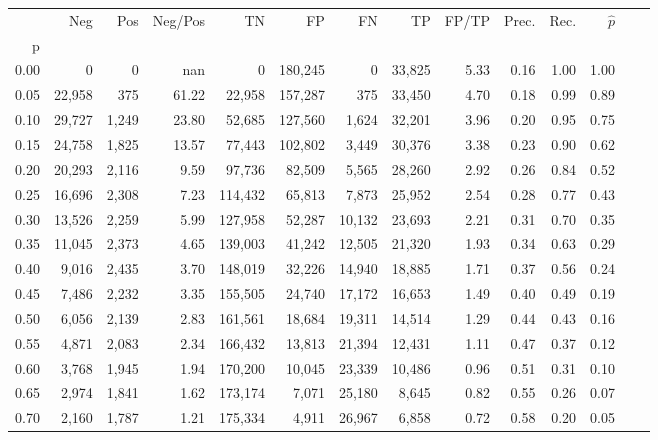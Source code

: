 \begin{tabular}{rrrrrrrrrrrrrr}
\toprule
{} &     Neg &    Pos & Neg/Pos &       TN &       FP &      FN &      TP & FP/TP & Prec. &  Rec. & $\hat{p}$ \\
p    &         &        &         &          &          &         &         &       &       &       &           \\
\midrule
0.00 &       0 &      0 &     nan &        0 &  180,245 &       0 &  33,825 &  5.33 &  0.16 &  1.00 &      1.00 \\
0.05 &  22,958 &    375 &   61.22 &   22,958 &  157,287 &     375 &  33,450 &  4.70 &  0.18 &  0.99 &      0.89 \\
0.10 &  29,727 &  1,249 &   23.80 &   52,685 &  127,560 &   1,624 &  32,201 &  3.96 &  0.20 &  0.95 &      0.75 \\
0.15 &  24,758 &  1,825 &   13.57 &   77,443 &  102,802 &   3,449 &  30,376 &  3.38 &  0.23 &  0.90 &      0.62 \\
0.20 &  20,293 &  2,116 &    9.59 &   97,736 &   82,509 &   5,565 &  28,260 &  2.92 &  0.26 &  0.84 &      0.52 \\
0.25 &  16,696 &  2,308 &    7.23 &  114,432 &   65,813 &   7,873 &  25,952 &  2.54 &  0.28 &  0.77 &      0.43 \\
0.30 &  13,526 &  2,259 &    5.99 &  127,958 &   52,287 &  10,132 &  23,693 &  2.21 &  0.31 &  0.70 &      0.35 \\
0.35 &  11,045 &  2,373 &    4.65 &  139,003 &   41,242 &  12,505 &  21,320 &  1.93 &  0.34 &  0.63 &      0.29 \\
0.40 &   9,016 &  2,435 &    3.70 &  148,019 &   32,226 &  14,940 &  18,885 &  1.71 &  0.37 &  0.56 &      0.24 \\
0.45 &   7,486 &  2,232 &    3.35 &  155,505 &   24,740 &  17,172 &  16,653 &  1.49 &  0.40 &  0.49 &      0.19 \\
0.50 &   6,056 &  2,139 &    2.83 &  161,561 &   18,684 &  19,311 &  14,514 &  1.29 &  0.44 &  0.43 &      0.16 \\
0.55 &   4,871 &  2,083 &    2.34 &  166,432 &   13,813 &  21,394 &  12,431 &  1.11 &  0.47 &  0.37 &      0.12 \\
0.60 &   3,768 &  1,945 &    1.94 &  170,200 &   10,045 &  23,339 &  10,486 &  0.96 &  0.51 &  0.31 &      0.10 \\
0.65 &   2,974 &  1,841 &    1.62 &  173,174 &    7,071 &  25,180 &   8,645 &  0.82 &  0.55 &  0.26 &      0.07 \\
0.70 &   2,160 &  1,787 &    1.21 &  175,334 &    4,911 &  26,967 &   6,858 &  0.72 &  0.58 &  0.20 &      0.05 \\

\end{tabular}
